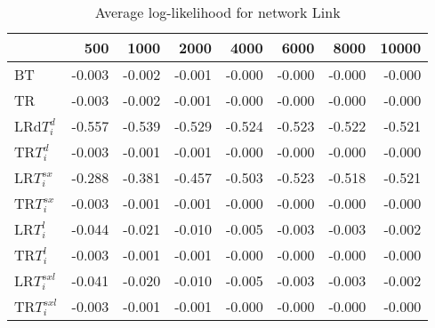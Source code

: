 \begin{table}
 \begin{center}
 \begin{tabular}{lrrrrrrr}
& 500 &  1000 & 2000 & 4000 & 6000& 8000&  10000\\\hline
BT & -0.003 & -0.002 & -0.001 & -0.000 & -0.000 & -0.000 & -0.000\\\hline
TR & -0.003 & -0.002 & -0.001 & -0.000 & -0.000 & -0.000 & -0.000\\\hline
LRd$T_i^d$ & -0.557 & -0.539 & -0.529 & -0.524 & -0.523 & -0.522 & -0.521\\\hline
TR$T_i^d$ & -0.003 & -0.001 & -0.001 & -0.000 & -0.000 & -0.000 & -0.000\\\hline
LR$T_i^{sx}$ & -0.288 & -0.381 & -0.457 & -0.503 & -0.523 & -0.518 & -0.521\\\hline
TR$T_i^{sx}$ & -0.003 & -0.001 & -0.001 & -0.000 & -0.000 & -0.000 & -0.000\\\hline
LR$T_i^l$ & -0.044 & -0.021 & -0.010 & -0.005 & -0.003 & -0.003 & -0.002\\\hline
TR$T_i^l$ & -0.003 & -0.001 & -0.001 & -0.000 & -0.000 & -0.000 & -0.000\\\hline
LR$T_i^{sxl}$ & -0.041 & -0.020 & -0.010 & -0.005 & -0.003 & -0.003 & -0.002\\\hline
TR$T_i^{sxl}$ & -0.003 & -0.001 & -0.001 & -0.000 & -0.000 & -0.000 & -0.000\\\hline
\end{tabular}
\end{center}
\caption{Average log-likelihood for network Link }
\label{Linkll}
\end{table}


